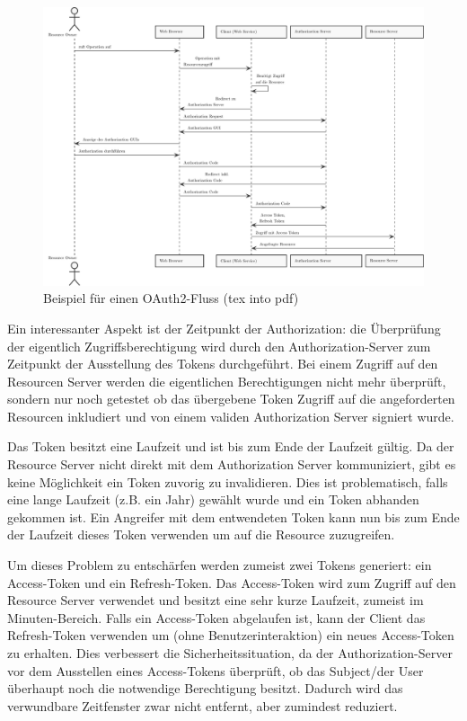\begin{figure}[h!]
	\includegraphics[width=\textwidth]{graphs/oauth2.pdf}
	\centering
	\caption{Beispiel für einen OAuth2-Fluss (tex into pdf)}
\end{figure}

Ein interessanter Aspekt ist der Zeitpunkt der Authorization: die Überprüfung der eigentlich Zugriffsberechtigung wird durch den Authorization-Server zum Zeitpunkt der Ausstellung des Tokens durchgeführt. Bei einem Zugriff auf den Resourcen Server werden die eigentlichen Berechtigungen nicht mehr überprüft, sondern nur noch getestet ob das übergebene Token Zugriff auf die angeforderten Resourcen inkludiert und von einem validen Authorization Server signiert wurde.

Das Token besitzt eine Laufzeit und ist bis zum Ende der Laufzeit gültig. Da der Resource Server nicht direkt mit dem Authorization Server kommuniziert, gibt es keine Möglichkeit ein Token zuvorig zu invalidieren. Dies ist problematisch, falls eine lange Laufzeit (z.B. ein Jahr) gewählt wurde und ein Token abhanden gekommen ist. Ein Angreifer mit dem entwendeten Token kann nun bis zum Ende der Laufzeit dieses Token verwenden um auf die Resource zuzugreifen.

Um dieses Problem zu entschärfen werden zumeist zwei Tokens generiert: ein Access-Token und ein Refresh-Token. Das Access-Token wird zum Zugriff auf den Resource Server verwendet und besitzt eine sehr kurze Laufzeit, zumeist im Minuten-Bereich. Falls ein Access-Token abgelaufen ist, kann der Client das Refresh-Token verwenden um (ohne Benutzerinteraktion) ein neues Access-Token zu erhalten. Dies verbessert die Sicherheitssituation, da der Authorization-Server vor dem Ausstellen eines Access-Tokens überprüft, ob das Subject/der User überhaupt noch die notwendige Berechtigung besitzt. Dadurch wird das verwundbare Zeitfenster zwar nicht entfernt, aber zumindest reduziert.

